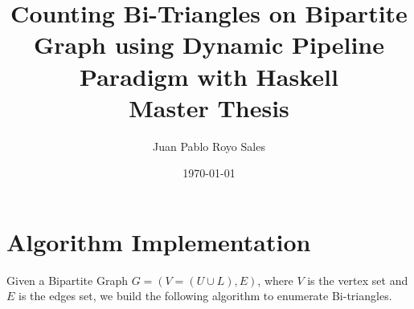 \documentclass[12pt, a4paper]{article}
\title{%
      Counting Bi-Triangles on Bipartite Graph using Dynamic Pipeline Paradigm with Haskell\\
      Master Thesis
}
\author{Juan Pablo Royo Sales}
\affil{Universitat Politècnica de Catalunya}
\date\today
\begin{document}


\section{Algorithm Implementation}

Given a Bipartite Graph $G = (V = (U \cup L), E)$, where $V$ is the vertex set and 
$E$ is the edges set, we build the following algorithm to enumerate Bi-triangles.
\end{document}
